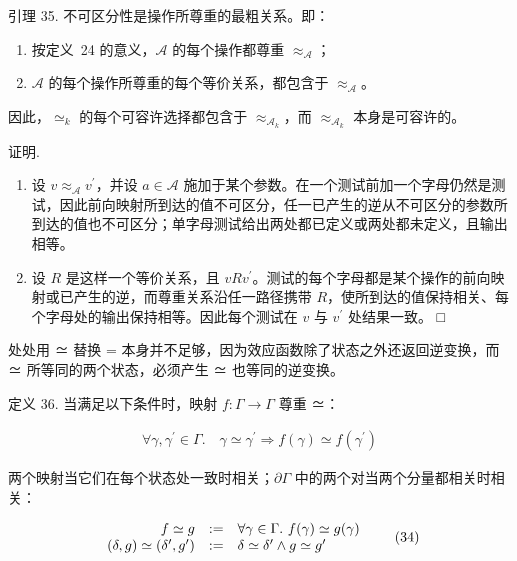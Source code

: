 引理 35. 不可区分性是操作所尊重的最粗关系。即：

\begin{enumerate}
\def\labelenumi{\arabic{enumi}.}
\item
  按定义~24 的意义，\(\mathcal{A}\) 的每个操作都尊重 \(\approx _ { \mathcal { A } }\)；
\item
  \(\mathcal{A}\) 的每个操作所尊重的每个等价关系，都包含于 \(\approx _ { \mathcal { A } }\)。
\end{enumerate}

因此，\(\simeq _ { k }\) 的每个可容许选择都包含于 \(\approx _ { \mathcal { A } _ { k } }\)，而 \(\approx _ { \mathcal { A } _ { k } }\) 本身是可容许的。

证明.

\begin{enumerate}
\def\labelenumi{\arabic{enumi}.}
\item
  设 \(v \approx _ { \mathcal { A } } v ^ { \prime }\)，并设 \(a \in \mathcal { A }\) 施加于某个参数。在一个测试前加一个字母仍然是测试，因此前向映射所到达的值不可区分，任一已产生的逆从不可区分的参数所到达的值也不可区分；单字母测试给出两处都已定义或两处都未定义，且输出相等。
\item
  设 \(R\) 是这样一个等价关系，且 \(v R v ^ { \prime }\)。测试的每个字母都是某个操作的前向映射或已产生的逆，而尊重关系沿任一路径携带 \(R\)，使所到达的值保持相关、每个字母处的输出保持相等。因此每个测试在 \(v\) 与 \(v ^ { \prime }\) 处结果一致。 □
\end{enumerate}

处处用 ≃ 替换 = 本身并不足够，因为效应函数除了状态之外还返回逆变换，而 ≃ 所等同的两个状态，必须产生 ≃ 也等同的逆变换。

定义 36. 当满足以下条件时，映射 \(f : \Gamma \to \Gamma\) 尊重 ≃：

\[
\begin{array} { r } { \forall \gamma , \gamma ^ { \prime } \in \Gamma . \quad \gamma \simeq \gamma ^ { \prime } \Rightarrow f ( \gamma ) \simeq f ( \gamma ^ { \prime } ) } \end{array}\tag{33}
\]

两个映射当它们在每个状态处一致时相关；\(\partial \Gamma\) 中的两个对当两个分量都相关时相关：

\[
\begin{array} { r c l } { f \simeq g } & { : = } & { \forall \gamma \in \Gamma . \ f ( \gamma ) \simeq g ( \gamma ) } \\ { ( \delta , g ) \simeq ( \delta ^ { \prime } , g ^ { \prime } ) } & { : = } & { \delta \simeq \delta ^ { \prime } \wedge g \simeq g ^ { \prime } } \end{array}\tag{34}
\]

